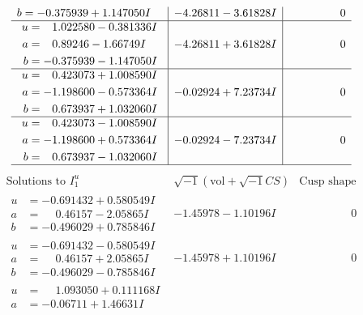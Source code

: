 \documentclass[1p]{elsarticle_modified}
\theoremstyle{definition}
\newcommand{\I}{\sqrt{-1}}
\begin{document}
$$\begin{array}{c|c|c}
\begin{aligned}
b &= -0.375939 + 1.147050 I\end{aligned}
 & -4.26811 - 3.61828 I & \phantom{-0.000000 } 0 \\ \hline\begin{aligned}
u &= \phantom{-}1.022580 - 0.381336 I \\
a &= \phantom{-}0.89246 - 1.66749 I \\
b &= -0.375939 - 1.147050 I\end{aligned}
 & -4.26811 + 3.61828 I & \phantom{-0.000000 } 0 \\ \hline\begin{aligned}
u &= \phantom{-}0.423073 + 1.008590 I \\
a &= -1.198600 - 0.573364 I \\
b &= \phantom{-}0.673937 + 1.032060 I\end{aligned}
 & -0.02924 + 7.23734 I & \phantom{-0.000000 } 0 \\ \hline\begin{aligned}
u &= \phantom{-}0.423073 - 1.008590 I \\
a &= -1.198600 + 0.573364 I \\
b &= \phantom{-}0.673937 - 1.032060 I\end{aligned}
 & -0.02924 - 7.23734 I & \phantom{-0.000000 } 0\\
 \hline 
 \end{array}$$\newpage$$\begin{array}{c|c|c}  
\text{Solutions to }I^u_{1}& \I (\text{vol} + \sqrt{-1}CS) & \text{Cusp shape}\\
 \hline 
\begin{aligned}
u &= -0.691432 + 0.580549 I \\
a &= \phantom{-}0.46157 - 2.05865 I \\
b &= -0.496029 + 0.785846 I\end{aligned}
 & -1.45978 - 1.10196 I & \phantom{-0.000000 } 0 \\ \hline\begin{aligned}
u &= -0.691432 - 0.580549 I \\
a &= \phantom{-}0.46157 + 2.05865 I \\
b &= -0.496029 - 0.785846 I\end{aligned}
 & -1.45978 + 1.10196 I & \phantom{-0.000000 } 0 \\ \hline\begin{aligned}
u &= \phantom{-}1.093050 + 0.111168 I \\
a &= -0.06711 + 1.46631 I \\

\end{aligned}
\end{array}$$
\end{document}
